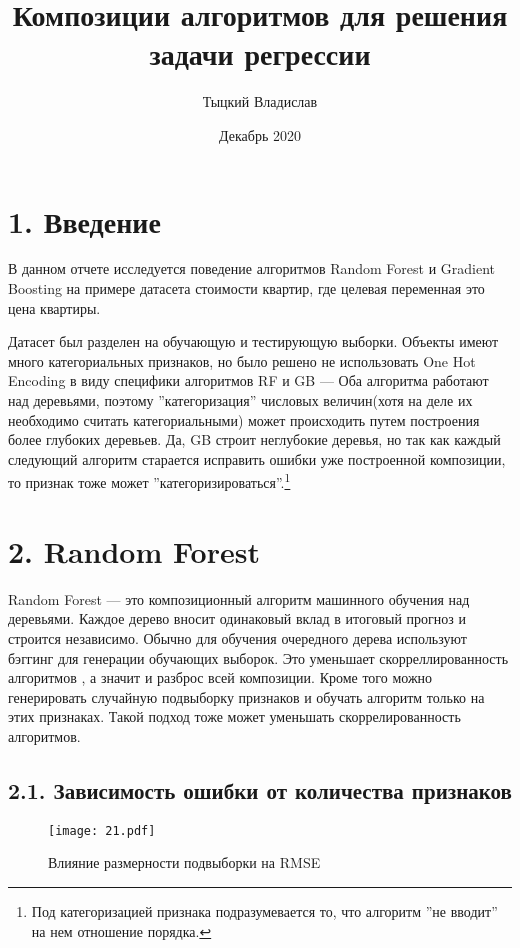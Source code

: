 \documentclass[12pt,fleqn]{article}
\title{Композиции алгоритмов для решения задачи регрессии}
\author{Тыцкий Владислав}
\date{Декабрь 2020}
\begin{document}
\maketitle

\section{1. Введение}
В данном отчете исследуется поведение алгоритмов Random Forest и Gradient Boosting
на примере датасета стоимости квартир, где целевая переменная это цена квартиры.

Датасет был разделен на обучающую и тестирующую выборки. Объекты имеют много категориальных
признаков, но было решено не использовать One Hot Encoding в виду 
специфики алгоритмов RF и GB --- Оба алгоритма работают над деревьями, поэтому
''категоризация'' числовых величин(хотя на деле их необходимо считать категориальными)
может происходить путем построения более глубоких деревьев. Да, GB строит неглубокие деревья,
но так как каждый следующий алгоритм старается исправить ошибки уже построенной композиции,
то признак тоже может ''категоризироваться''.\footnote{Под категоризацией признака
подразумевается то, что алгоритм ''не вводит'' на нем отношение порядка.}

\section{2. Random Forest}
Random Forest --- это композиционный алгоритм машинного обучения над деревьями. 
Каждое дерево вносит одинаковый вклад в итоговый прогноз и строится независимо. Обычно для обучения 
очередного дерева используют
бэггинг для генерации обучающих выборок. Это уменьшает скорреллированность алгоритмов
, а значит и разброс всей композиции. Кроме того можно генерировать случайную подвыборку
признаков и обучать алгоритм только на этих признаках. Такой подход тоже может уменьшать
скоррелированность алгоритмов.

\newpage 

\subsection{2.1. Зависимость ошибки от количества признаков}

\begin{figure}[htb]
    \centering
    \texttt{[image: 21.pdf]}
    \caption{Влияние размерности подвыборки на RMSE}
    \label{feature_size_RF}
\end{figure}
\end{document}
